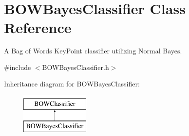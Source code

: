 \hypertarget{classBOWBayesClassifier}{
\section{BOWBayesClassifier Class Reference}
\label{classBOWBayesClassifier}
}


A Bag of Words KeyPoint classifier utilizing Normal Bayes.  




{\ttfamily \#include $<$BOWBayesClassifier.h$>$}

Inheritance diagram for BOWBayesClassifier:\begin{figure}[H]
\begin{center}
\leavevmode
\includegraphics[height=2cm]{classBOWBayesClassifier}
\end{center}
\end{figure}
